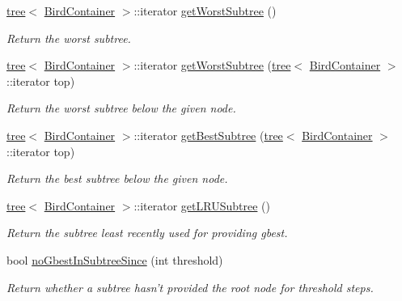 \begin{CompactItemize}
\hyperlink{classtree}{tree}$<$ \hyperlink{structBirdContainer}{BirdContainer} $>$::iterator \hyperlink{classAdaptivePyramidSwarm_6d57f30724f6a0b7f4f8e5a31ae11f88}{getWorstSubtree} ()
\begin{CompactList}\small\item\em Return the worst subtree. \item\end{CompactList}\item 
\hyperlink{classtree}{tree}$<$ \hyperlink{structBirdContainer}{BirdContainer} $>$::iterator \hyperlink{classAdaptivePyramidSwarm_b16d5e586c4f1732ca51ccdd892fe173}{getWorstSubtree} (\hyperlink{classtree}{tree}$<$ \hyperlink{structBirdContainer}{BirdContainer} $>$::iterator top)
\begin{CompactList}\small\item\em Return the worst subtree below the given node. \item\end{CompactList}\item 
\hyperlink{classtree}{tree}$<$ \hyperlink{structBirdContainer}{BirdContainer} $>$::iterator \hyperlink{classAdaptivePyramidSwarm_e37cf3ca7ce7c3b88f0309ff98cb3052}{getBestSubtree} (\hyperlink{classtree}{tree}$<$ \hyperlink{structBirdContainer}{BirdContainer} $>$::iterator top)
\begin{CompactList}\small\item\em Return the best subtree below the given node. \item\end{CompactList}\item 
\hyperlink{classtree}{tree}$<$ \hyperlink{structBirdContainer}{BirdContainer} $>$::iterator \hyperlink{classAdaptivePyramidSwarm_a7d7026a1e51c961f105b748da828479}{getLRUSubtree} ()
\begin{CompactList}\small\item\em Return the subtree least recently used for providing gbest. \item\end{CompactList}\item 
bool \hyperlink{classAdaptivePyramidSwarm_aa498e09dcf52a80be682a41e6da5563}{noGbestInSubtreeSince} (int threshold)
\begin{CompactList}\small\item\em Return whether a subtree hasn't provided the root node for threshold steps. \item\end{CompactList}\item 

\end{CompactItemize}
